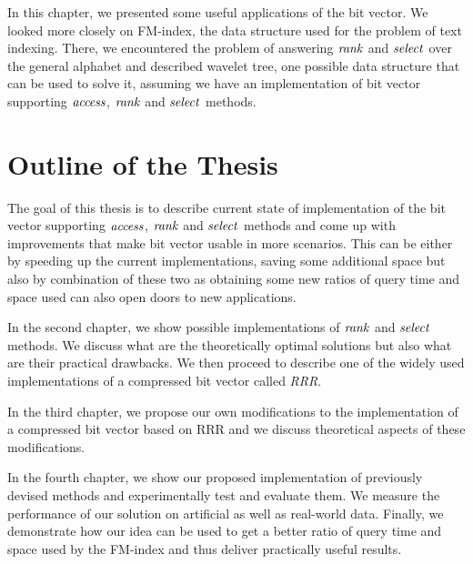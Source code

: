 In this chapter, we presented some useful applications of the bit vector. We looked more closely on
FM-index, the data structure used for the problem of text indexing. There, we encountered the
problem of answering $\mathit{rank}$ and $\mathit{select}$ over the general alphabet and described wavelet tree,
one possible data structure that can be used to solve it, assuming we have an implementation of
bit vector supporting $\mathit{access}$, $\mathit{rank}$ and $\mathit{select}$ methods.

\section{Outline of the Thesis}

The goal of this thesis is to describe current state of implementation of the bit vector
supporting $\mathit{access}$, $\mathit{rank}$ and $\mathit{select}$ methods and come up with improvements that
make bit vector usable in more scenarios. This can be either by speeding up the current
implementations, saving some additional space but also by combination of these two as
obtaining some new ratios of query time and space used can also open doors to new applications.

In the second chapter, we show possible implementations of $\mathit{rank}$ and
$\mathit{select}$ methods. We discuss what are the theoretically optimal solutions but also
what are their practical drawbacks. We then proceed to describe one of the
widely used implementations of a compressed bit vector called \textit{RRR}.

In the third chapter, we propose our own modifications to the implementation of
a compressed bit vector based on RRR and we discuss theoretical aspects of these
modifications.

In the fourth chapter, we show our proposed implementation of previously devised
methods and experimentally test and evaluate them. We measure the performance
of our solution on artificial as well as real-world data. Finally, we demonstrate
how our idea can be used to get a better ratio of query time and space used by the
FM-index and thus deliver practically useful results.